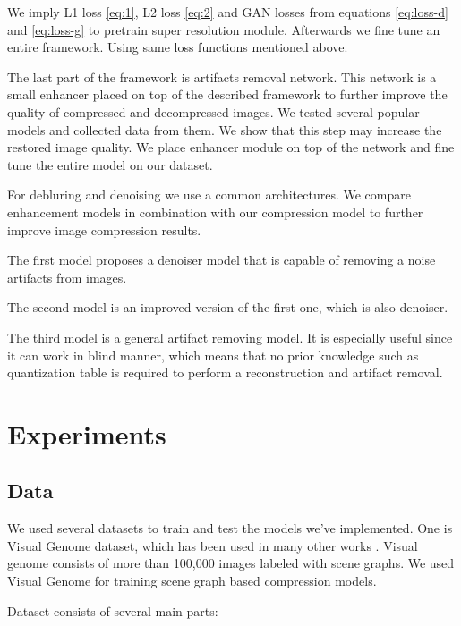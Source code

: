 We imply L1 loss \ref{eq:1}, L2 loss \ref{eq:2} and GAN losses from equations \ref{eq:loss-d} and \ref{eq:loss-g} to pretrain super resolution module. Afterwards we fine tune an entire framework. Using same loss functions mentioned above.

The last part of the framework is artifacts removal network. This network is a small enhancer placed on top of the described framework to further improve the quality of compressed and decompressed images. We tested several popular models and collected data from them. We show that this step may increase the restored image quality. We place enhancer module on top of the network and fine tune the entire model on our dataset.

For debluring and denoising we use a common architectures. We compare enhancement models \cite{zhang2017learning, zhang2020plug, jiang_towards_2021} in combination with our compression model to further improve image compression results.

The first model \cite{zhang2017learning} proposes a denoiser model that is capable of removing a noise artifacts from images.

The second model \cite{zhang2020plug} is an improved version of the first one, which is also denoiser.

The third model \cite{jiang_towards_2021} is a general artifact removing model. It is especially useful since it can work in blind manner, which means that no prior knowledge such as quantization table is required to perform a reconstruction and artifact removal.

\chapter{Experiments}
\label{chapter:experiments}

\section{Data}
\label{section:data}

We used several datasets to train and test the models we've implemented. One is Visual Genome dataset, which has been used in many other works \cite{krishna_visual_2017}. Visual genome consists of more than 100,000 images labeled with scene graphs. We used Visual Genome for training scene graph based compression models.

Dataset consists of several main parts:

